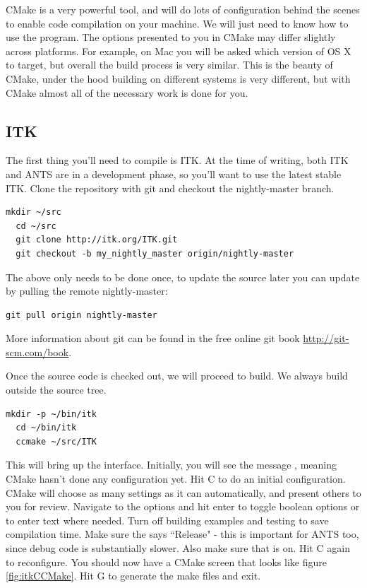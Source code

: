 \documentclass{InsightArticle}
\begin{document}
CMake is a very powerful tool, and will do lots of configuration behind the scenes to enable code compilation on your machine. We will just need to know how to use the  program. The options presented to you in CMake may differ slightly across platforms. For example, on Mac you will be asked which version of OS X to target, but overall the build process is very similar. This is the beauty of CMake, under the hood building on different systems is very different, but with CMake almost all of the necessary work is done for you.


\subsection{ITK}

The first thing you'll need to compile is ITK. At the time of writing, both ITK and ANTS are in a development phase, so you'll want to use the latest stable ITK. Clone the repository with git and checkout the nightly-master branch.
\begin{lstlisting}[style=bash]
  mkdir ~/src
  cd ~/src
  git clone http://itk.org/ITK.git
  git checkout -b my_nightly_master origin/nightly-master
\end{lstlisting}
The above only needs to be done once, to update the source later you can update by pulling the remote nightly-master:
\begin{lstlisting}[style=bash]
  git pull origin nightly-master
\end{lstlisting}

More information about git can be found in the free online git book \url{http://git-scm.com/book}.

Once the source code is checked out, we will proceed to build. We always build outside the source tree.
\begin{lstlisting}[style=bash]
  mkdir -p ~/bin/itk
  cd ~/bin/itk
  ccmake ~/src/ITK
\end{lstlisting}
This will bring up the  interface. Initially, you will see the message , meaning CMake hasn't done any configuration yet. Hit C to do an initial configuration. CMake will choose as many settings as it can automatically, and present others to you for review. Navigate to the options and hit enter to toggle boolean options or to enter text where needed.  Turn off building examples and testing to save compilation time. Make sure the  says ``Release" - this is important for ANTS too, since debug code is substantially slower. Also make sure that  is on. Hit C again to reconfigure. You should now have a CMake screen that looks like figure \ref{fig:itkCCMake}. Hit G to generate the make files and exit. 
\end{document}
